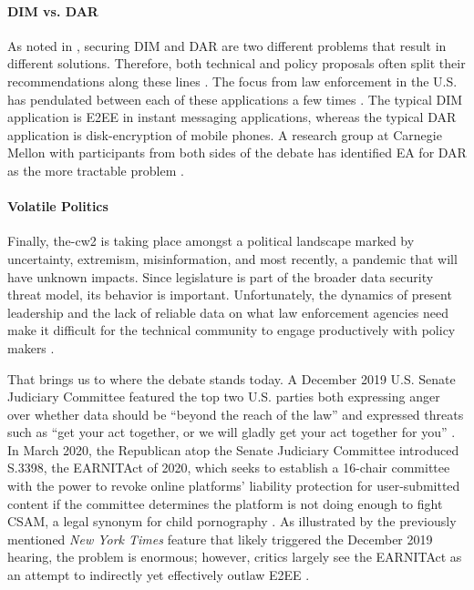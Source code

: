 \paragraph*{\ac{DIM} vs. \ac{DAR}} As noted in , securing \acl{DIM} and \acl{DAR} are two
different problems that result in different solutions. Therefore, both technical and policy proposals often split their
recommendations along these lines \cite{group_2019} \cite{owen_law_2018}. The focus from law enforcement in the U.S. has
pendulated between each of these applications a few times \cite{schneier_2019}. The typical \ac{DIM} application is
\ac{E2EE} in instant messaging applications, whereas the typical \ac{DAR} application is \ac{disk-encryption} of mobile
phones. A research group at Carnegie Mellon with participants from both sides of the debate has identified \ac{EA} for
\ac{DAR} as the more tractable problem \cite{group_2019}.

\paragraph*{Volatile Politics} Finally, \ac{the-cw2} is taking place amongst a political landscape marked by
uncertainty, extremism, misinformation, and most recently, a pandemic that will have unknown impacts. Since legislature
is part of the broader data security threat model, its behavior is important. Unfortunately, the dynamics of present
leadership and the lack of reliable data on what law enforcement agencies need make it difficult for the technical
community to engage productively with policy makers \cite{granick_2018}.

That brings us to where the debate stands today. A December 2019 U.S. Senate Judiciary Committee featured the top two
U.S. parties both expressing anger over whether data should be ``beyond the reach of the law'' and expressed threats
such as ``get your act together, or we will gladly get your act together for you'' \cite{geller_2019}. In March 2020,
the Republican atop the Senate Judiciary Committee introduced S.3398, the \ac{EARNITAct} of 2020, which seeks to
establish a 16-chair committee with the power to revoke online platforms' liability protection for user-submitted
content if the committee determines the platform is not doing enough to fight \ac{CSAM}, a legal synonym for child
pornography \cite{graham_s3398_2020}. As illustrated by the previously mentioned \textit{New York Times} feature
\cite{keller_internet_2019} that likely triggered the December 2019 hearing, the problem is enormous; however, critics
largely see the \ac{EARNITAct} as an attempt to indirectly yet effectively outlaw \ac{E2EE} \cite{newman_2020}
\cite{pfefferkorn_2020}.

